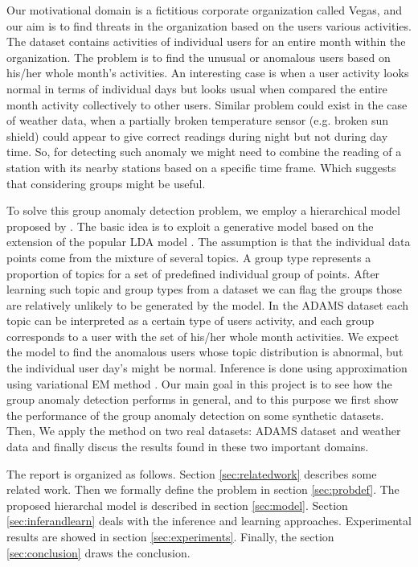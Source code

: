 \documentclass[letterpaper]{article}
\begin{document}
Our motivational domain is a fictitious corporate organization called Vegas, and our aim is to find threats in the organization based on the users various activities. The dataset contains activities of individual users for an entire month within the organization. The problem is to find the unusual or anomalous users based on his/her whole month's activities. An interesting case is when a user activity looks normal in terms of individual days but looks usual when compared the entire month activity collectively to other users. Similar problem could exist in the case of weather data, when a partially broken temperature sensor (e.g. broken sun shield) could appear to give correct readings during night but not during day time. So, for detecting such anomaly we might need to combine the reading of a station with its nearby stations based on a specific time frame. Which suggests that considering groups might be useful.

To solve this group anomaly detection problem, we employ a hierarchical model proposed by \cite{xiong2011hierarchical}. The basic idea is to exploit a generative model based on the extension of the popular LDA model \cite{blei2003latent}. The assumption is that the individual data points come from the mixture of several topics. A group type represents a proportion of topics for a set of predefined individual group of points. After learning such topic and group types from a dataset we can flag the groups those are relatively unlikely to be generated by the model. In the ADAMS dataset each topic can be interpreted as a certain type of users activity, and each group corresponds to a user with the set of his/her whole month activities. We expect the model to find the anomalous users whose topic distribution is abnormal, but the individual user day's might be normal. Inference is done using approximation using variational EM method \cite{xiong2011hierarchical}. Our main goal in this project is to see how the group anomaly detection performs in general, and to this purpose we first show the performance of the group anomaly detection on some synthetic datasets. Then, We apply the method on two real datasets: ADAMS dataset and weather data and finally discus the results found in these two important domains.

The report is organized as follows. Section \ref{sec:relatedwork} describes some related work. Then we formally define the problem in section \ref{sec:probdef}. The proposed hierarchal model is described in section \ref{sec:model}. Section \ref{sec:inferandlearn} deals with the inference and learning approaches. Experimental results are showed in section \ref{sec:experiments}. Finally, the section \ref{sec:conclusion} draws the conclusion.
\end{document}
